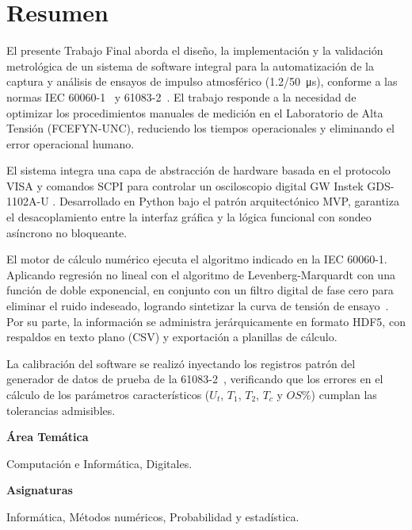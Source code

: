 \newpage
\section*{Resumen}
\label{sec:resumen}
\vspace{3\baselineskip}

El presente Trabajo Final aborda el diseño, la implementación y la validación metrológica de un sistema de software integral para la automatización de la captura y análisis de ensayos de impulso atmosférico (\qty[parse-numbers=false]{1.2/50}{\micro\second}), conforme a las normas IEC 60060-1~\cite{iec60060_1} y 61083-2~\cite{iec61083_2}. El trabajo responde a la necesidad de optimizar los procedimientos manuales de medición en el Laboratorio de Alta Tensión (FCEFYN-UNC), reduciendo los tiempos operacionales y eliminando el error operacional humano.

El sistema integra una capa de abstracción de hardware basada en el protocolo VISA y comandos SCPI para controlar un osciloscopio digital GW Instek GDS-1102A-U \cite{gds1000au_ProgrammingManual}. Desarrollado en Python bajo el patrón arquitectónico MVP, garantiza el desacoplamiento entre la interfaz gráfica y la lógica funcional con sondeo asíncrono no bloqueante.

El motor de cálculo numérico ejecuta el algoritmo indicado en la IEC 60060-1. Aplicando regresión no lineal con el algoritmo de Levenberg-Marquardt con una función de doble exponencial, en conjunto con un filtro digital de fase cero para eliminar el ruido indeseado, logrando sintetizar la curva de tensión de ensayo~\cite{iec60060_1}. Por su parte, la información se administra jerárquicamente en formato HDF5, con respaldos en texto plano (CSV) y exportación a planillas de cálculo.

La calibración del software se realizó inyectando los registros patrón del generador de datos de prueba de la 61083-2~\cite{iec61083_2}, verificando que los errores en el cálculo de los parámetros característicos ($U_t$, $T_1$, $T_2$, $T_c$ y $OS\%$) cumplan las tolerancias admisibles.

\vspace{1\baselineskip}

\textbf{Área Temática}

Computación e Informática, Digitales.
\vspace{1\baselineskip}

\textbf{Asignaturas}

Informática, Métodos numéricos, Probabilidad y estadística.
\vspace{1\baselineskip}


